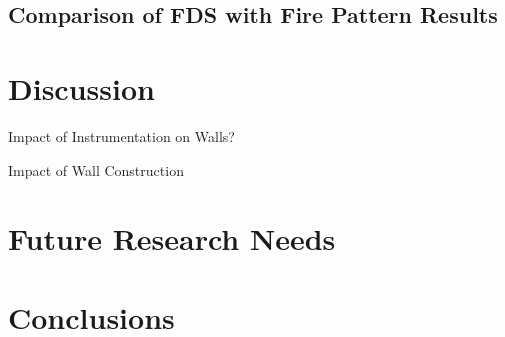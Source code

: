 \documentclass[twoside]{uocthesis}
\begin{document}
\section{Comparison of FDS with Fire Pattern Results}

\chapter{Discussion}


Impact of Instrumentation on Walls?

Impact of Wall Construction


\chapter{Future Research Needs}



\chapter{Conclusions}






\end{document}
